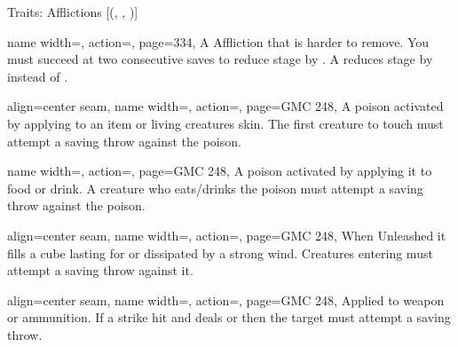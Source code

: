 \begin{PageFrontLandscape}
\begin{TablesHalf}{\frontTableHeight}
\begin{Table}{Traits: Afflictions }[{(, , )}]
            \begin{entry}{}{%
                name width=\conditionLength,%
                action=\Virulent,
                page=334,
            }
                A Affliction that is harder to remove.
                You must succeed at two consecutive saves to reduce stage by .
                A  reduces stage by  instead of .
            \end{entry}
            \breakLine
            \begin{entry}{}{%
                align=center seam,
                name width=\conditionLength,%
                action=\Contact,
                page=GMC 248,
            }
                A poison activated by applying to an item or living creatures skin.
                The first creature to touch must attempt a saving throw against the poison.\\
            \end{entry}
            \begin{entry}{}{%
                name width=\conditionLength,%
                action=\Ingested,
                page=GMC 248,
            }
                A poison activated by applying it to food or drink.
                A creature who eats/drinks the poison must attempt a saving throw against the poison.
            \end{entry}
            \begin{entry}{}{%
                align=center seam,
                name width=\conditionLength,%
                action=\Inhaled,
                page=GMC 248,
            }%
                When Unleashed it fills a  cube lasting for  or dissipated by a strong wind.
                Creatures entering must attempt a saving throw against it. \\
            \end{entry}
            \begin{entry}{}{%
                align=center seam,
                name width=\conditionLength,%
                action=\Injury,
                page=GMC 248,
            }
                Applied to weapon or ammunition. If a strike hit and deals  or  then the target must attempt a saving throw. \\
                \hfill

\end{entry}
\end{Table}
\end{TablesHalf}
\end{PageFrontLandscape}
